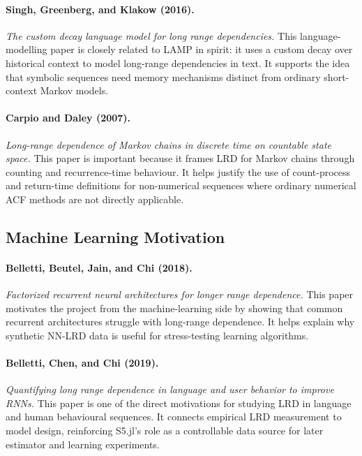 \paragraph{Singh, Greenberg, and Klakow (2016).}
\emph{The custom decay language model for long range dependencies.}
This language-modelling paper is closely related to LAMP in spirit: it uses a
custom decay over historical context to model long-range dependencies in text.
It supports the idea that symbolic sequences need memory mechanisms distinct
from ordinary short-context Markov models.

\paragraph{Carpio and Daley (2007).}
\emph{Long-range dependence of Markov chains in discrete time on countable state
space.}
This paper is important because it frames LRD for Markov chains through counting
and recurrence-time behaviour. It helps justify the use of count-process and
return-time definitions for non-numerical sequences where ordinary numerical ACF
methods are not directly applicable.

\subsection{Machine Learning Motivation}

\paragraph{Belletti, Beutel, Jain, and Chi (2018).}
\emph{Factorized recurrent neural architectures for longer range dependence.}
This paper motivates the project from the machine-learning side by showing that
common recurrent architectures struggle with long-range dependence. It helps
explain why synthetic NN-LRD data is useful for stress-testing learning
algorithms.

\paragraph{Belletti, Chen, and Chi (2019).}
\emph{Quantifying long range dependence in language and user behavior to improve
RNNs.}
This paper is one of the direct motivations for studying LRD in language and
human behavioural sequences. It connects empirical LRD measurement to model
design, reinforcing S5.jl's role as a controllable data source for later
estimator and learning experiments.
